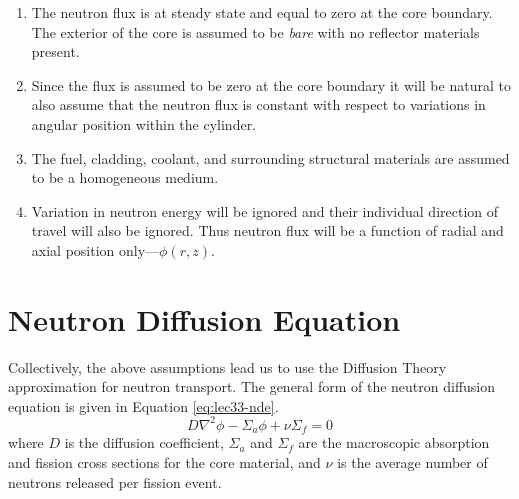 \begin{enumerate}
\item The neutron flux is at steady state and equal to zero at the core boundary.  The exterior of the core is assumed to be \emph{bare} with no reflector materials present.  
\item Since the flux is assumed to be zero at the core boundary it will be natural to also assume that the neutron flux is constant with respect to variations in angular position within the cylinder.
\item The fuel, cladding, coolant, and surrounding structural materials are assumed to be a homogeneous medium.
\item Variation in neutron energy will be ignored and their individual direction of travel will also be ignored.  Thus neutron flux will be a function of radial and axial position only---$\phi(r,z)$.
\end{enumerate}

\section{Neutron Diffusion Equation}

Collectively, the above assumptions lead us to use the Diffusion Theory approximation for neutron transport.  The general form of the neutron diffusion equation is given in Equation \ref{eq:lec33-nde}.
\begin{equation}
D\nabla^2\phi - \Sigma_a \phi + \nu \Sigma_f = 0
\label{eq:lec33-nde}
\end{equation}
where $D$ is the diffusion coefficient, $\Sigma_a$ and $\Sigma_f$ are the macroscopic absorption and fission cross sections for the core material, and $\nu$ is the average number of neutrons released per fission event.

